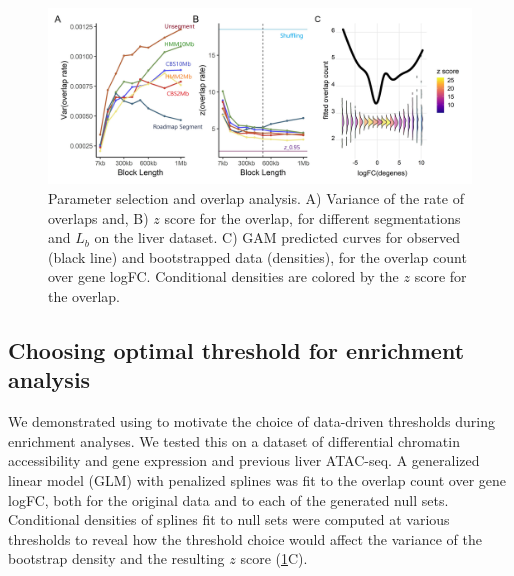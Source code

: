 \begin{figure}[H]
\centering%
\setlength{\abovecaptionskip}{-0.1cm}
\setlength{\belowcaptionskip}{-0.1cm}
\includegraphics[scale=0.06]{Figures/fig2_3.jpeg}
\caption{
  Parameter selection and overlap analysis.
  A) Variance of the rate of overlaps and,
  B) $z$ score for the overlap,
  for different segmentations and $L_b$ on the liver 
  dataset.
  C) GAM predicted curves for observed (black line) and
  bootstrapped data (densities),
  for the overlap count over gene logFC.
  Conditional densities are colored by the $z$ score for the overlap.
}
\label{fig:result}
\end{figure}


\subsection{Choosing optimal threshold for enrichment analysis}
We demonstrated using \bootranges to motivate the choice of data-driven thresholds 
during enrichment analyses. We tested this on a dataset of differential chromatin accessibility and gene expression 
\citep{alasoo2018shared,lee2020fluent} and previous liver ATAC-seq.
A generalized linear model (GLM) with penalized splines was
fit to the overlap count over gene logFC, both for the original
data and to each of the generated null sets.
Conditional densities of splines fit to null sets
were computed at various thresholds to reveal how
the threshold choice would affect the
variance of the bootstrap density and the resulting $z$ score
(\cref{fig:result}C). 



